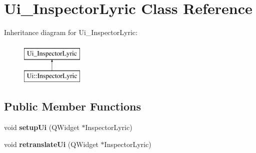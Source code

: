 \hypertarget{class_ui___inspector_lyric}{}\section{Ui\+\_\+\+Inspector\+Lyric Class Reference}
\label{class_ui___inspector_lyric}
Inheritance diagram for Ui\+\_\+\+Inspector\+Lyric\+:\begin{figure}[H]
\begin{center}
\leavevmode
\includegraphics[height=2.000000cm]{class_ui___inspector_lyric}
\end{center}
\end{figure}
\subsection*{Public Member Functions}
\begin{DoxyCompactItemize}
\item 
\mbox{\label{class_ui___inspector_lyric_ae69396ab1eadeb959c9371090255f16a}} 
void {\bfseries setup\+Ui} (Q\+Widget $\ast$Inspector\+Lyric)
\item 
\mbox{\label{class_ui___inspector_lyric_a8904fa8b47f188365d52631793111722}} 
void {\bfseries retranslate\+Ui} (Q\+Widget $\ast$Inspector\+Lyric)
\end{DoxyCompactItemize}
